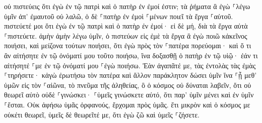 \documentclass{openreader}
\begin{document}
οὐ πιστεύεις ὅτι ἐγὼ ἐν τῷ πατρὶ καὶ ὁ πατὴρ ἐν ἐμοί ἐστιν; τὰ ῥήματα ἃ ἐγὼ ⸀λέγω ὑμῖν ἀπ’ ἐμαυτοῦ οὐ λαλῶ, ὁ δὲ ⸀πατὴρ ἐν ἐμοὶ ⸀μένων ποιεῖ τὰ ἔργα ⸀αὐτοῦ. 
πιστεύετέ μοι ὅτι ἐγὼ ἐν τῷ πατρὶ καὶ ὁ πατὴρ ἐν ἐμοί· εἰ δὲ μή, διὰ τὰ ἔργα αὐτὰ ⸀πιστεύετε. 
ἀμὴν ἀμὴν λέγω ὑμῖν, ὁ πιστεύων εἰς ἐμὲ τὰ ἔργα ἃ ἐγὼ ποιῶ κἀκεῖνος ποιήσει, καὶ μείζονα τούτων ποιήσει, ὅτι ἐγὼ πρὸς τὸν ⸀πατέρα πορεύομαι· 
καὶ ὅ τι ἂν αἰτήσητε ἐν τῷ ὀνόματί μου τοῦτο ποιήσω, ἵνα δοξασθῇ ὁ πατὴρ ἐν τῷ υἱῷ· 
ἐάν τι αἰτήσητέ ⸀με ἐν τῷ ὀνόματί μου ⸀ἐγὼ ποιήσω. 
Ἐὰν ἀγαπᾶτέ με, τὰς ἐντολὰς τὰς ἐμὰς ⸀τηρήσετε· 
κἀγὼ ἐρωτήσω τὸν πατέρα καὶ ἄλλον παράκλητον δώσει ὑμῖν ἵνα ⸀ᾖ μεθ’ ὑμῶν εἰς τὸν ⸀αἰῶνα, 
τὸ πνεῦμα τῆς ἀληθείας, ὃ ὁ κόσμος οὐ δύναται λαβεῖν, ὅτι οὐ θεωρεῖ αὐτὸ οὐδὲ ⸀γινώσκει· ⸀ὑμεῖς γινώσκετε αὐτό, ὅτι παρ’ ὑμῖν μένει καὶ ἐν ὑμῖν ⸀ἔσται. 
Οὐκ ἀφήσω ὑμᾶς ὀρφανούς, ἔρχομαι πρὸς ὑμᾶς. 
ἔτι μικρὸν καὶ ὁ κόσμος με οὐκέτι θεωρεῖ, ὑμεῖς δὲ θεωρεῖτέ με, ὅτι ἐγὼ ζῶ καὶ ὑμεῖς ⸀ζήσετε. 
\end{document}
